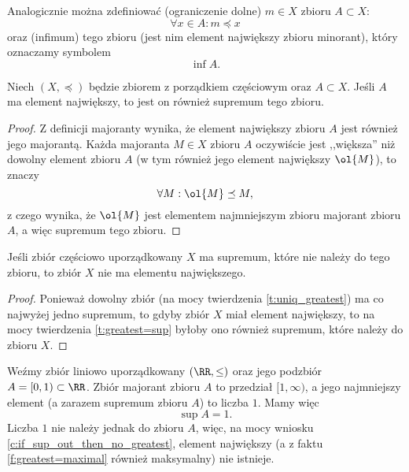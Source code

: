 \begin{remark}
    Analogicznie można zdefiniować  (ograniczenie dolne) $m \in X$ zbioru $A \subset X$:
    $$ \forall x \in A : m \preceq x $$
    oraz  (infimum) tego zbioru (jest nim element największy zbioru minorant), który oznaczamy symbolem $$\inf A.$$
\end{remark}

\begin{theorem}
    \label{t:greatest=sup}
    Niech $(X, \preceq)$ będzie zbiorem z porządkiem częściowym oraz $A \subset X$. Jeśli $A$ ma element największy, to jest on również supremum tego zbioru.
\end{theorem}
\begin{proof}
    Z definicji majoranty wynika, że element największy zbioru $A$ jest również jego majorantą. Każda majoranta $M \in X$ zbioru $A$ oczywiście jest ,,większa'' niż dowolny element zbioru $A$ (w tym również jego element największy $\ol{M}$), to znaczy
    $$ \forall M : \ol{M} \preceq M, $$
    z czego wynika, że $\ol{M}$ jest elementem najmniejszym zbioru majorant zbioru $A$, a więc supremum tego zbioru.
\end{proof}

\begin{corollary}
    \label{c:if_sup_out_then_no_greatest}
    Jeśli zbiór częściowo uporządkowany $X$ ma supremum, które nie należy do tego zbioru, to zbiór $X$ nie ma elementu największego.
\end{corollary}
\begin{proof}
    Ponieważ dowolny zbiór (na mocy twierdzenia \ref{t:uniq_greatest}) ma co najwyżej jedno supremum, to gdyby zbiór $X$ miał element największy, to na mocy twierdzenia \ref{t:greatest=sup} byłoby ono również supremum, które należy do zbioru $X$.
\end{proof}

\begin{example}
    Weźmy zbiór liniowo uporządkowany $(\RR, \leq)$ oraz jego podzbiór $A = [0, 1) \subset \RR$. Zbiór majorant zbioru $A$ to przedział $[1, \infty)$, a jego najmniejszy element (a zarazem supremum zbioru $A$) to liczba $1$. Mamy więc
    $$ \sup A = 1. $$
    Liczba $1$ nie należy jednak do zbioru $A$, więc, na mocy wniosku \ref{c:if_sup_out_then_no_greatest}, element największy (a z faktu \ref{f:greatest=maximal} również maksymalny) nie istnieje.
\end{example}

